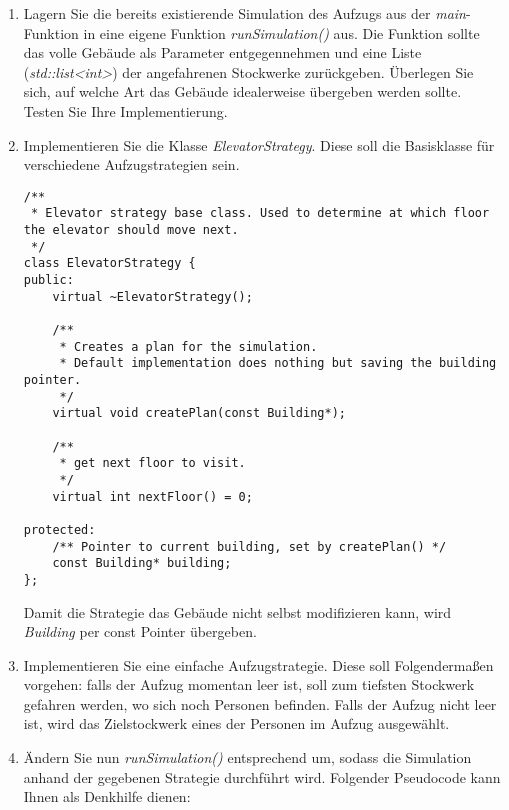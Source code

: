 \documentclass[
  accentcolor=tud1c,	%
  colorbacktitle,		%
  inverttitle,			%
  german,				%
  twoside
]{tudexercise}
\begin{document}
\begin{enumerate}
\item
Lagern Sie die bereits existierende Simulation des Aufzugs aus der \emph{main}-Funktion in eine eigene Funktion \emph{runSimulation()} aus. Die Funktion sollte das volle Gebäude als Parameter entgegennehmen und eine Liste (\emph{std::list<int>}) der angefahrenen Stockwerke zurückgeben. Überlegen Sie sich, auf welche Art das Gebäude idealerweise übergeben werden sollte. Testen Sie Ihre Implementierung.

\item Implementieren Sie die Klasse \emph{ElevatorStrategy}. Diese soll die Basisklasse für verschiedene Aufzugstrategien sein.

\begin{lstlisting}
/**
 * Elevator strategy base class. Used to determine at which floor the elevator should move next.
 */
class ElevatorStrategy {
public:
	virtual ~ElevatorStrategy();

	/**
	 * Creates a plan for the simulation. 
	 * Default implementation does nothing but saving the building pointer.
	 */
	virtual void createPlan(const Building*);

	/** 
	 * get next floor to visit.
	 */
	virtual int nextFloor() = 0;

protected:
	/** Pointer to current building, set by createPlan() */
	const Building* building;
};
\end{lstlisting}

Damit die Strategie das Gebäude nicht selbst modifizieren kann, wird \emph{Building} per const Pointer übergeben.

\item Implementieren Sie eine einfache Aufzugstrategie. Diese soll Folgendermaßen vorgehen: falls der Aufzug momentan leer ist, soll zum tiefsten Stockwerk gefahren werden, wo sich noch Personen befinden. Falls der Aufzug nicht leer ist, wird das Zielstockwerk eines der Personen im Aufzug ausgewählt.

\item Ändern Sie nun \emph{runSimulation()} entsprechend um, sodass die Simulation anhand der gegebenen Strategie durchführt wird. Folgender Pseudocode kann Ihnen als Denkhilfe dienen: \\
\begin{algorithm}[H]
 \SetAlgoLined
\end{algorithm}


\end{enumerate}
\end{document}
